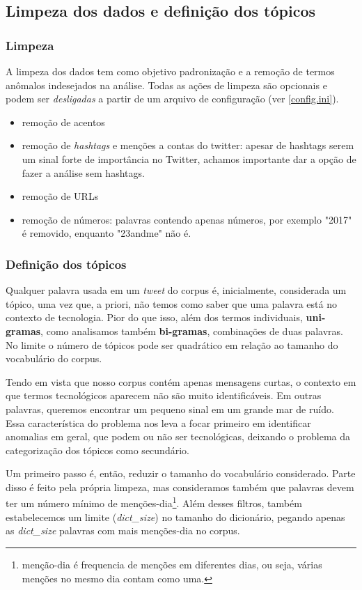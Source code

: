 \documentclass[paper=a4, fontsize=11pt]{scrartcl}
\numberwithin{equation}{section}		%
\numberwithin{figure}{section}			%
\numberwithin{table}{section}				%
\begin{document}
\subsection{Limpeza dos dados e definição dos tópicos}
\subsubsection{Limpeza}
A limpeza dos dados tem como objetivo padronização e a remoção de termos anômalos indesejados na análise. Todas as ações de limpeza são opcionais e podem ser \emph{desligadas} a partir de um arquivo de configuração (ver \ref{config.ini}).
\begin{itemize}
	\item  remoção de acentos
	\item  remoção de \emph{hashtags} e menções a contas do twitter: apesar de hashtags serem um sinal forte de importância no Twitter, achamos importante dar a opção de fazer a análise sem hashtags.
	\item  remoção de URLs
	\item  remoção de números: palavras contendo apenas números, por exemplo "2017" é removido, enquanto "23andme" não é.
\end{itemize}
\subsubsection{Definição dos tópicos}
Qualquer palavra usada em um \emph{tweet} do corpus é, inicialmente, considerada um tópico, uma vez que, a priori, não temos como saber que uma palavra está no contexto de tecnologia. Pior do que isso, além dos termos individuais, \textbf{uni-gramas}, como analisamos também \textbf{bi-gramas}, combinações de duas palavras. No limite o número de tópicos pode ser quadrático em relação ao tamanho do vocabulário do corpus.

Tendo em vista que nosso corpus contém apenas mensagens curtas, o contexto em que termos tecnológicos aparecem não são muito identificáveis. Em outras palavras, queremos encontrar um pequeno sinal em um grande mar de ruído. Essa característica do problema nos leva a focar primeiro em identificar anomalias em geral, que podem ou não ser tecnológicas, deixando o problema da categorização dos tópicos como secundário.

Um primeiro passo é, então, reduzir o tamanho do vocabulário considerado. Parte disso é feito pela própria limpeza, mas consideramos também que palavras devem ter um número mínimo de menções-dia\footnote{menção-dia é frequencia de menções em diferentes dias, ou seja, várias menções no mesmo dia contam como uma.}. Além desses filtros, também estabelecemos um limite (\emph{dict\_size}) no tamanho do dicionário, pegando apenas as \emph{dict\_size} palavras com mais menções-dia no corpus.
\end{document}

